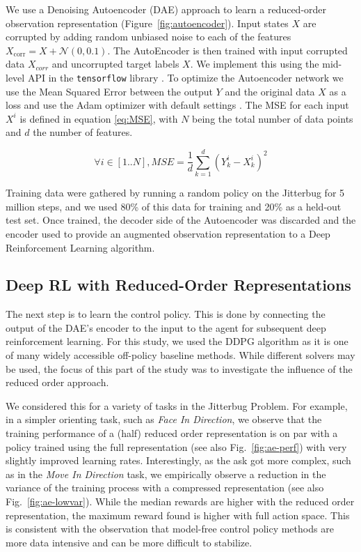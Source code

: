 \documentclass[letterpaper, 10 pt, conference]{ieeeconf}
\begin{document}
We use a Denoising Autoencoder (DAE) approach to learn a reduced-order observation representation (Figure~\ref{fig:autoencoder}).
Input states $X$ are corrupted by adding random unbiased noise to each of the features $X_\text{corr} = X + \mathcal{N}(0, 0.1)$.
The AutoEncoder is then trained with input corrupted data $X_{corr}$ and uncorrupted target labels $X$.
We implement this using the mid-level API in the \texttt{tensorflow} library \cite{Abadi2015Tensorflow}.
To optimize the Autoencoder network we use the Mean Squared Error between the output $Y$ and the original data $X$ as a loss and use the Adam optimizer with default settings \cite{Adam}. The MSE for each input $X^i$ is defined in equation \ref{eq:MSE}, with $N$ being the total number of data points and $d$ the number of features.

\begin{equation}
\forall i \in [1..N], MSE = \frac{1}{d} \sum_{k=1}^d(Y_{k}^i - X_{k}^i)^2
\label{eq:MSE}
\end{equation}

Training data were gathered by running a random policy on the Jitterbug for 5 million steps, and we used 80\% of this data for training and 20\% as a held-out test set.
Once trained, the decoder side of the Autoencoder was discarded and the encoder used to provide an augmented observation representation to a Deep Reinforcement Learning algorithm.

\subsection{Deep RL with Reduced-Order Representations}

The next step is to learn the control policy.   This is done by connecting the output of the DAE's encoder to the input to the agent for subsequent deep reinforcement learning.     For this study, we used the DDPG algorithm as it is one of many  widely accessible off-policy baseline methods.  While different solvers may be used, the focus of this part of the study was to investigate the influence of the reduced order approach.  

We considered this for a variety of tasks in the Jitterbug Problem.  For example, in a simpler orienting task, such as \emph{Face In Direction}, we observe that the training performance of a (half) reduced order representation is on par with a policy trained using the full representation (see also Fig.~\ref{fig:ae-perf}) with very slightly improved learning rates.  Interestingly, as the ask got more complex, such as in the \emph{Move In Direction} task, we empirically observe a reduction in the variance of the training process with a compressed representation (see also Fig.~\ref{fig:ae-lowvar}).  While the median rewards are higher with the reduced order representation, the maximum reward found is higher with full action space.  This is consistent with the observation that model-free control policy methods are more data intensive and can be more difficult to stabilize.  
\end{document}
